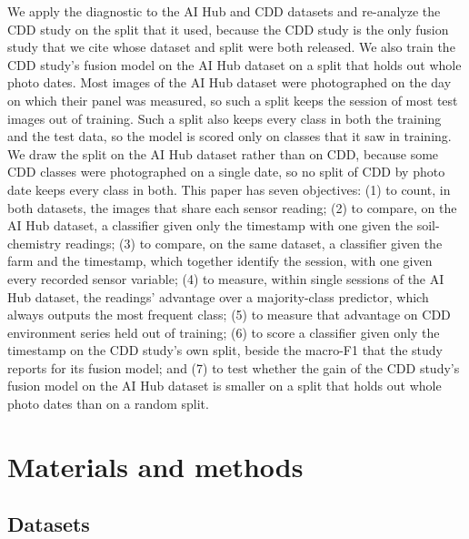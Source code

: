 \documentclass[preprint,12pt,authoryear,nopreprintline]{elsarticle}
\begin{document}
We apply the diagnostic to the AI Hub and CDD datasets and re-analyze the CDD study
\citep{appliedsci2024dacon} on the split that it used, because the CDD study is the
only fusion study that we cite whose dataset and split were both released. We also
train the CDD study's fusion model on the AI Hub dataset on a split that holds out
whole photo dates. Most images of the AI Hub dataset were photographed on the day on
which their panel was measured, so such a split keeps the session of most test images
out of training. Such a split also keeps every class in both the training and the test data, so the
model is scored only on classes that it saw in training. We draw the split on the AI Hub
dataset rather than on CDD, because some CDD classes were photographed on a single date,
so no split of CDD by photo date keeps every class in both. This paper has seven objectives: (1) to count, in both datasets, the images that share each
sensor reading; (2) to compare, on the AI Hub dataset, a classifier given only the
timestamp with one given the soil-chemistry readings; (3) to compare, on the same dataset, a classifier given the farm and the timestamp, which together identify the session, with one given every
recorded sensor variable; (4) to measure, within single sessions of the AI Hub dataset, the readings'
advantage over a majority-class predictor, which always outputs the most frequent
class; (5) to measure that advantage on CDD environment series held out of training;
(6) to score a classifier given only the timestamp on the CDD
study's own split, beside the macro-F1 that the study reports for its fusion model; and (7) to test whether the gain of the CDD study's fusion model on the AI Hub dataset is
smaller on a split that holds out whole photo dates than on a random split.

\section{Materials and methods}
\label{sec:methods}

\subsection{Datasets}
\label{sec:corpora}
\end{document}
